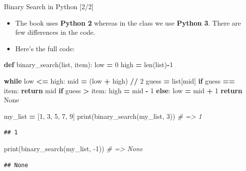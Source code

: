 \documentclass[ignorenonframetext,]{beamer}
\newenvironment{Shaded}{\begin{snugshade}}{\end{snugshade}}
\newcommand{\BuiltInTok}[1]{#1}
\newcommand{\CommentTok}[1]{\textcolor[rgb]{0.56,0.35,0.01}{\textit{#1}}}
\newcommand{\ControlFlowTok}[1]{\textcolor[rgb]{0.13,0.29,0.53}{\textbf{#1}}}
\newcommand{\DecValTok}[1]{\textcolor[rgb]{0.00,0.00,0.81}{#1}}
\newcommand{\KeywordTok}[1]{\textcolor[rgb]{0.13,0.29,0.53}{\textbf{#1}}}
\newcommand{\NormalTok}[1]{#1}
\newcommand{\OperatorTok}[1]{\textcolor[rgb]{0.81,0.36,0.00}{\textbf{#1}}}
\newcommand{\VariableTok}[1]{\textcolor[rgb]{0.00,0.00,0.00}{#1}}
\providecommand{\tightlist}{%
  \setlength{\itemsep}{0pt}\setlength{\parskip}{0pt}}
\begin{document}
\begin{frame}[fragile]{Binary Search in Python {[}2/2{]}}
\protect\hypertarget{binary-search-in-python-22}{}

\begin{itemize}
\tightlist
\item
  The book uses \textbf{Python 2} whereas in the class we use
  \textbf{Python 3}. There are few differences in the code.
\item
  Here's the full code:
\end{itemize}

\begin{Shaded}
\begin{Highlighting}[]
\KeywordTok{def}\NormalTok{ binary_search(}\BuiltInTok{list}\NormalTok{, item):}
\NormalTok{  low }\OperatorTok{=} \DecValTok{0}
\NormalTok{  high }\OperatorTok{=} \BuiltInTok{len}\NormalTok{(}\BuiltInTok{list}\NormalTok{)}\OperatorTok{-}\DecValTok{1}
  
  \ControlFlowTok{while}\NormalTok{ low }\OperatorTok{<=}\NormalTok{ high:}
\NormalTok{    mid }\OperatorTok{=}\NormalTok{ (low }\OperatorTok{+}\NormalTok{ high) }\OperatorTok{//} \DecValTok{2}
\NormalTok{    guess }\OperatorTok{=} \BuiltInTok{list}\NormalTok{[mid]}
    \ControlFlowTok{if}\NormalTok{ guess }\OperatorTok{==}\NormalTok{ item:}
      \ControlFlowTok{return}\NormalTok{ mid}
    \ControlFlowTok{if}\NormalTok{ guess }\OperatorTok{>}\NormalTok{ item:}
\NormalTok{      high }\OperatorTok{=}\NormalTok{ mid }\OperatorTok{-} \DecValTok{1}
    \ControlFlowTok{else}\NormalTok{:}
\NormalTok{      low }\OperatorTok{=}\NormalTok{ mid }\OperatorTok{+} \DecValTok{1}
  \ControlFlowTok{return} \VariableTok{None}
  
  
\NormalTok{my_list }\OperatorTok{=}\NormalTok{ [}\DecValTok{1}\NormalTok{, }\DecValTok{3}\NormalTok{, }\DecValTok{5}\NormalTok{, }\DecValTok{7}\NormalTok{, }\DecValTok{9}\NormalTok{]}
\BuiltInTok{print}\NormalTok{(binary_search(my_list, }\DecValTok{3}\NormalTok{)) }\CommentTok{# => 1}
\end{Highlighting}
\end{Shaded}

\begin{verbatim}
## 1
\end{verbatim}

\begin{Shaded}
\begin{Highlighting}[]
\BuiltInTok{print}\NormalTok{(binary_search(my_list, }\DecValTok{-1}\NormalTok{)) }\CommentTok{# => None}
\end{Highlighting}
\end{Shaded}

\begin{verbatim}
## None
\end{verbatim}

\end{frame}
\end{document}
